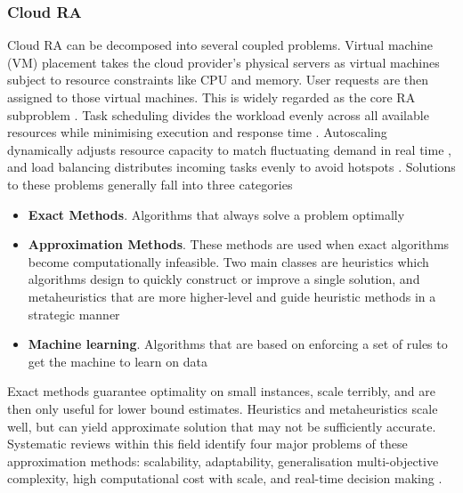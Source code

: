 \documentclass[12pt]{article}
\begin{document}
\subsubsection{Cloud RA}
Cloud RA can be decomposed into several coupled problems. Virtual machine (VM) placement takes the cloud provider's physical servers as virtual machines subject to resource constraints like CPU and memory. User requests are then assigned to those virtual machines. This is widely regarded as the core RA subproblem \cite{saidi2023}. Task scheduling divides the workload evenly across all available resources while minimising execution and response time \cite{lbts2024}. Autoscaling dynamically adjusts resource capacity to match fluctuating demand in real time \cite{autoscaling2023}, and load balancing distributes incoming tasks evenly to avoid hotspots \cite{lb2024}.
\newline
Solutions to these problems generally fall into three categories
\begin{itemize}
    \item \textbf{Exact Methods}. Algorithms that always solve a problem optimally
    \item \textbf{Approximation Methods}. These methods are used when exact algorithms become computationally infeasible. Two main classes are heuristics which algorithms design to quickly construct or improve a single solution, and metaheuristics that are more higher-level and guide heuristic methods in a strategic manner \cite{alkhalifa2025comparative}
    \item \textbf{Machine learning}. Algorithms that are based on enforcing a set of rules to get the machine to learn on data
\end{itemize}

Exact methods guarantee optimality on small instances, scale terribly, and are then only useful for lower bound estimates. Heuristics and metaheuristics scale well, but can yield approximate solution that may not be sufficiently accurate. Systematic reviews within this field identify four major problems of these approximation methods: scalability, adaptability, generalisation multi-objective complexity, high computational cost with scale, and real-time decision making \cite{mohamaddiah2014, lbts2024, 10854610, DAHMANI2025100616, ml_ra_litrev2025, hu2021attend2pack}.
\end{document}
